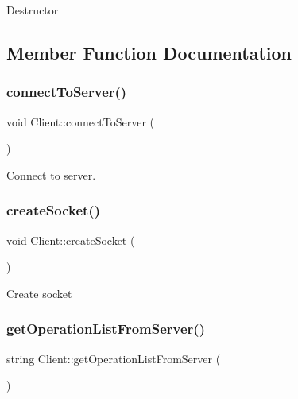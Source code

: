 Destructor 

\subsection{Member Function Documentation}
\mbox{\label{classClient_a484b660517d6a610b6733bee7e96cb8c}} 
\subsubsection{\texorpdfstring{connect\+To\+Server()}{connectToServer()}}
{\footnotesize\ttfamily void Client\+::connect\+To\+Server (\begin{DoxyParamCaption}{ }\end{DoxyParamCaption})\hspace{0.3cm}{\ttfamily [private]}}

Connect to server. \mbox{\label{classClient_a76e843ac6155814b72b5b07d50c0d42e}} 
\subsubsection{\texorpdfstring{create\+Socket()}{createSocket()}}
{\footnotesize\ttfamily void Client\+::create\+Socket (\begin{DoxyParamCaption}{ }\end{DoxyParamCaption})\hspace{0.3cm}{\ttfamily [private]}}

Create socket \mbox{\label{classClient_af0e814ffbcec066870a0f9d06aab1c80}} 
\subsubsection{\texorpdfstring{get\+Operation\+List\+From\+Server()}{getOperationListFromServer()}}
{\footnotesize\ttfamily string Client\+::get\+Operation\+List\+From\+Server (\begin{DoxyParamCaption}{ }\end{DoxyParamCaption})}

